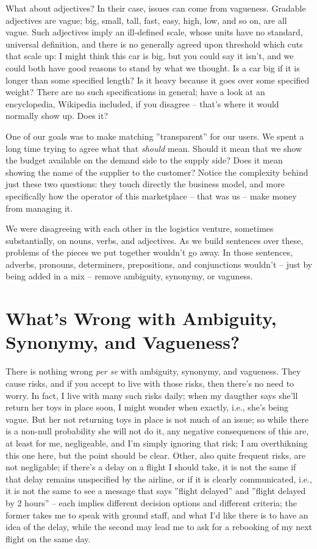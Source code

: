 \documentclass[graybox,envcountchap,sectrefs]{svmono}
\begin{document}
What about adjectives? In their case, issues can come from vagueness. Gradable adjectives are vague; big, small, tall, fast, easy, high, low, and so on, are all vague. Such adjectives imply an ill-defined scale, whose units have no standard, universal definition, and there is no generally agreed upon threshold which cuts that scale up: I might think this car is big, but you could say it isn't, and we could both have good reasons to stand by what we thought. Is a car big if it is longer than some specified length? Is it heavy because it goes over some specified weight? There are no such specifications in general; have a look at an encyclopedia, Wikipedia included, if you disagree -- that's where it would normally show up. Does it?

One of our goals was to make matching ''transparent'' for our users. We spent a long time trying to agree what that \textit{should} mean. Should it mean that we show the budget available on the demand side to the supply side? Does it mean showing the name of the supplier to the customer? Notice the complexity behind just these two questions: they touch directly the business model, and more specifically how the operator of this marketplace -- that was us -- make money from managing it.  

We were disagreeing with each other in the logistics venture, sometimes substantially, on nouns, verbs, and adjectives. As we build sentences over these, problems of the pieces we put together wouldn't go away. In those sentences, adverbs, pronouns, determiners, prepositions, and conjunctions wouldn't -- just by being added in a mix -- remove ambiguity, synonymy, or vaguness.


\section{What's Wrong with Ambiguity, Synonymy, and Vagueness?}
There is nothing wrong \textit{per se} with ambiguity, synonymy, and vagueness. They cause risks, and if you accept to live with those risks, then there's no need to worry. In fact, I live with many such risks daily; when my daugther says she'll return her toys in place soon, I might wonder when exactly, i.e., she's being vague. But her not returning toys in place is not much of an issue; so while there is a non-null probability she will not do it, any negative consequences of this are, at least for me, negligeable, and I'm simply ignoring that risk; I am overthikning this one here, but the point should be clear. Other, also quite frequent risks, are not negligable; if there's a delay on a flight I should take, it is not the same if that delay remains unspecified by the airline, or if it is clearly communicated, i.e., it is not the same to see a message that says ''flight delayed'' and ''flight delayed by 2 hours'' -- each implies different decision options and different criteria; the former takes me to speak with ground staff, and what I'd like there is to have an idea of the delay, while the second may lead me to ask for a rebooking of my next flight on the same day.
\end{document}
